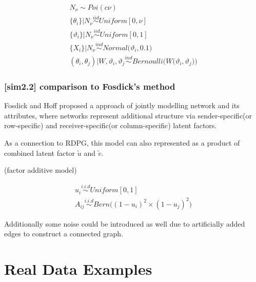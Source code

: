 \documentclass[12pt]{article}
\theoremstyle{definition}
\begin{document}
\begin{equation}
\begin{gathered}
N_{\nu} \sim Poi( c \nu) \\ 
\{ \theta_{i} \} \big| N_{\nu} \overset{iid}{\sim} Uniform[0, \nu]  \\ 
\{ \vartheta_{i} \} \big| N_{\nu} \overset{iid}{\sim} Uniform[0,1] \\ 
\{ X_{i}  \} | N_{\nu} \overset{ind}{\sim} Normal \big( \vartheta_{i}, 0.1 \big)  \\ 
(\theta_{i}, \theta_{j}) \big| W, \vartheta_{i}, \vartheta_{j} \overset{ind}{\sim} Bernoulli \big( W\big( \vartheta_{i}, \vartheta_{j} \big) \big) 
\end{gathered}
\end{equation}





\subsubsection{[sim2.2] comparison to Fosdick's method}


Fosdick and Hoff proposed a approach of jointly modelling network and its attributes, where networks represent additional structure via sender-specific(or row-specific) and receiver-specific(or column-specific) latent factors.

As a connection to RDPG, this model can also represented as a product of combined latent factor $\tilde{u}$ and $\tilde{v}$. 

(factor additive model)

\begin{equation}
\begin{gathered}
u_{i} \overset{i.i.d}{\sim} Uniform[0,1] \\ 
A_{ij}  \overset{i.i.d}{\sim} Bern \big(  ( 1 - u_{i})^2 \times (1 - u_{j})^2    \big)
\end{gathered}
\end{equation}



Additionally some noise could be introduced as well due to artificially added edges to construct a connected graph.






\newpage
\section{Real Data Examples}
\end{document}
